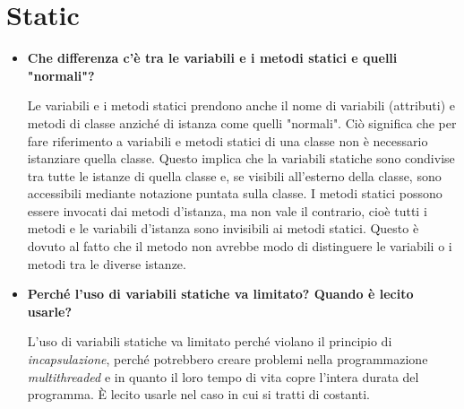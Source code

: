 \documentclass[12pt, a4paper]{article}
\begin{document}
\section{Static}
\begin{itemize}
    \item \textbf{Che differenza c'è tra le variabili e i metodi statici e quelli "normali"?}
    
    Le variabili e i metodi statici prendono anche il nome di variabili (attributi) e metodi di
    classe anziché di istanza come quelli "normali". Ciò significa che per fare
    riferimento a variabili e metodi statici di una classe non è necessario istanziare
    quella classe. Questo implica che la variabili statiche sono condivise tra tutte le
    istanze di quella classe e, se visibili all'esterno della classe, sono accessibili
    mediante notazione puntata sulla classe. I metodi statici possono essere invocati
    dai metodi d'istanza, ma non vale il contrario, cioè tutti i metodi e le variabili
    d'istanza sono invisibili ai metodi statici. Questo è dovuto al fatto che il metodo
    non avrebbe modo di distinguere le variabili o i metodi tra le diverse istanze.

    \item \textbf{Perché l'uso di variabili statiche va limitato? Quando è lecito usarle?}
    
    L'uso di variabili statiche va limitato perché violano il principio di
    \emph{incapsulazione}, perché potrebbero creare problemi nella programmazione
    \emph{multithreaded} e in quanto il loro tempo di vita copre l'intera durata
    del programma. È lecito usarle nel caso in cui si tratti di costanti.
\end{itemize}
\end{document}
